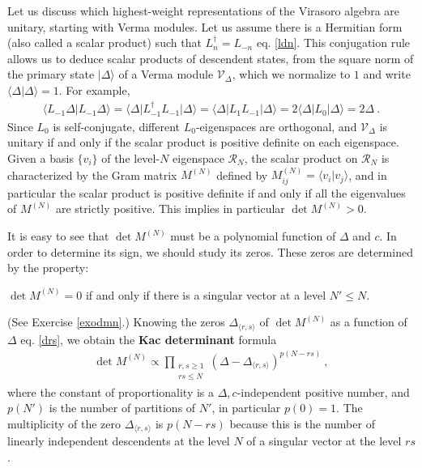 \documentclass[12pt, a4paper, notitlepage, twoside]{report}
\numberwithin{equation}{section}
\theoremstyle{break}
\begin{document}
Let us discuss which highest-weight representations of the Virasoro algebra are unitary, starting with Verma modules. Let us assume there is a Hermitian form (also called a scalar product) such that $L_n^\dagger = L_{-n}$ eq. \eqref{ldn}.
This conjugation rule allows us to deduce scalar products of descendent states, from the square norm of the primary state $|\Delta\rangle$ of a Verma module $\mathcal{V}_\Delta$, which we normalize to $1$ and write  $\langle \Delta|\Delta\rangle =1$. 
For example,
\begin{align}
 \langle L_{-1} \Delta|L_{-1}\Delta\rangle = \langle \Delta |L_{-1}^\dagger L_{-1}|\Delta\rangle =\langle \Delta |L_1 L_{-1}|\Delta\rangle = 2\langle \Delta|L_0|\Delta\rangle = 2\Delta\ . 
\label{levo} 
\end{align}
Since $L_0$ is self-conjugate, different $L_0$-eigenspaces are orthogonal, and $\mathcal V_\Delta$ is unitary if and only if the scalar product is positive definite on each eigenspace. 
Given a basis $\{v_i\}$ of the level-$N$ eigenspace $\mathcal{R}_N$, the scalar product on $\mathcal{R}_N$ is characterized by the Gram matrix $M^{(N)}$ defined by $M^{(N)}_{ij}=\langle v_i|v_j\rangle$, and in particular the scalar product is positive definite if and only if all the eigenvalues of $M^{(N)}$ are strictly positive. This implies in particular $\det M^{(N)}>0$.

It is easy to see that $\det M^{(N)}$ must be a polynomial function of $\Delta$ and $c$.
In order to determine its sign, we should study its zeros. These zeros are determined by the property:
\begin{center}
 \begin{minipage}{0.9\textwidth}
 $\det M^{(N)}=0$ if and only if there is a singular vector at a level $N'\leq N$.  
 \end{minipage}
\end{center}
(See Exercise \ref{exodmn}.) 
Knowing the zeros $\Delta_{\langle r,s \rangle}$ of $\det M^{(N)}$ as a function of $\Delta$ eq. \eqref{drs}, we obtain the \textbf{\boldmath Kac determinant} formula
\begin{align}
 \boxed{\det M^{(N)} \propto \prod_{\begin{smallmatrix} r,s\geq 1 \\ rs \leq N \end{smallmatrix}} (\Delta-\Delta_{\langle r,s \rangle})^{p(N-rs)}} \ ,
\end{align}
where the constant of proportionality is a $\Delta,c$-independent positive number, and $p(N')$ is the number of partitions of $N'$, in particular $p(0)=1$.
The multiplicity of the zero $\Delta_{\langle r,s \rangle}$ is $p(N-rs)$ because this is the number of linearly independent descendents at the level $N$ of a singular vector at the level $rs$.  
\end{document}
